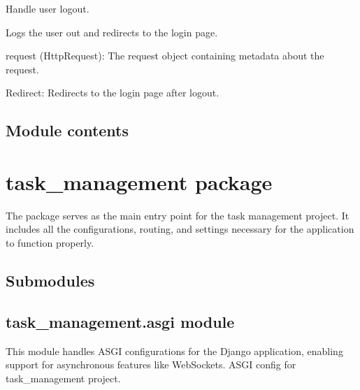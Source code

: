 \documentclass[letterpaper,10pt,english]{sphinxmanual}
\begin{document}
\begin{fulllineitems}
\label{\detokenize{authenticate:authenticate.views.logout}}
\pysigstartsignatures
{}
\pysigstopsignatures
\sphinxAtStartPar
Handle user logout.

\sphinxAtStartPar
Logs the user out and redirects to the login page.
\begin{description}
\sphinxAtStartPar
request (HttpRequest): The request object containing metadata about the request.

\sphinxAtStartPar
Redirect: Redirects to the login page after logout.

\end{description}

\end{fulllineitems}



\section{Module contents}
\label{\detokenize{authenticate:module-authenticate}}\label{\detokenize{authenticate:module-contents}}
\sphinxstepscope


\chapter{task\_management package}
\label{\detokenize{task_management:task-management-package}}\label{\detokenize{task_management::doc}}
\sphinxAtStartPar
The  package serves as the main entry point for the task management project. It includes all the configurations, routing, and settings necessary for the application to function properly.


\section{Submodules}
\label{\detokenize{task_management:submodules}}

\section{task\_management.asgi module}
\label{\detokenize{task_management:task-management-asgi-module}}
\sphinxAtStartPar
This module handles ASGI configurations for the Django application, enabling support for asynchronous features like WebSockets.
\label{\detokenize{task_management:module-task_management.asgi}}
\sphinxAtStartPar
ASGI config for task\_management project.
\end{document}
